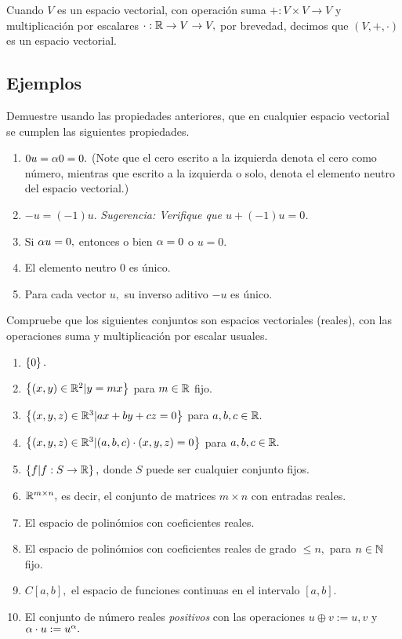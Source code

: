 \begin{observacion}
 Cuando $V$ es un espacio vectorial, con operaci\'on suma $+:V \times V \to V$ y multiplicaci\'on por escalares
$\cdot:\mathbb{R} \to V \to V,$ por brevedad, decimos que $(V, +, \cdot)$ es un espacio vectorial.
\end{observacion}



\subsection*{Ejemplos}


\begin{problema}[\dag]
Demuestre usando las propiedades anteriores, que en cualquier espacio vectorial se cumplen las siguientes propiedades.
\begin{enumerate}
 \item $0  u=\alpha  0=0.$ (Note que el cero escrito a la izquierda denota el cero como número, mientras que escrito a la izquierda o solo, denota el elemento neutro  del espacio vectorial.)
 \item $-u=(-1) u.$ \emph{Sugerencia: Verifique que $u+(-1)u=0$.}
 \item Si $\alpha u=0,$ entonces o bien $\alpha=0$ o $u=0.$
 \item El elemento neutro $0$ es único.
 \item Para cada vector $u,$ su inverso aditivo $-u$ es único.
\end{enumerate}
\end{problema}

\begin{problema}
 Compruebe que los siguientes conjuntos son espacios vectoriales (reales), con las operaciones suma y multiplicaci\'on por escalar usuales.
 \begin{enumerate}
 \item $\left\{ 0 \right\}.$
 \item $\left\{ (x,y)\in \mathbb{R}^{2}|y=mx \right\}$ para $m\in \mathbb{R}$ fijo.
 \item $\left\{ (x,y,z)\in \mathbb{R}^{3}| ax+by+cz=0 \right\}$ para $a,b,c\in \mathbb{R}.$
 \item $\left\{ (x,y,z)\in \mathbb{R}^{3}|(a,b,c)\cdot (x,y,z)=0 \right\}$ para $a,b,c\in \mathbb{R}.$
  \item $\left\{ f|f:S\to \mathbb{R} \right\},$ donde $S$ puede ser cualquier conjunto fijos.
  \item $\mathbb{R}^{m\times n},$ es decir, el conjunto de matrices $m\times n$ con entradas reales.
  \item  El espacio de polin\'omios con coeficientes reales.
  \item El espacio de polin\'omios con coeficientes reales de grado $\leq n,$ para $n \in \mathbb{N}$ fijo.
  \item $C[a,b],$ el espacio de funciones continuas en el intervalo $[a,b].$
  \item El conjunto de número reales \emph{positivos} con las operaciones $u\oplus v:= u,v$ y $\alpha \cdot u:=u^{\alpha}.$
 \end{enumerate}
\end{problema}

